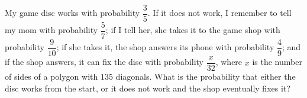 My game disc works with probability $\dfrac35$. If it does not work, I remember to tell my mom with probability $\dfrac57$; if I tell her, she takes it to the game shop with probability $\dfrac{9}{10}$; if she takes it, the shop answers its phone with probability $\dfrac49$; and if the shop answers, it can fix the disc with probability $\dfrac{x}{32}$, where $x$ is the number of sides of a polygon with $135$ diagonals. What is the probability that either the disc works from the start, or it does not work and the shop eventually fixes it?
